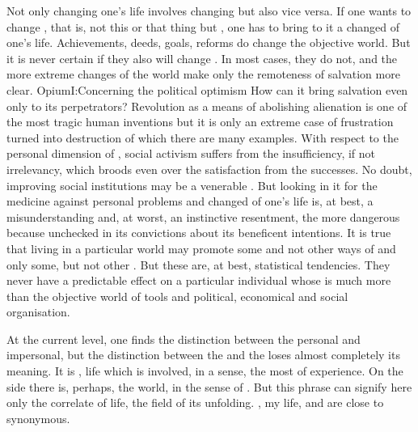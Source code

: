 \pa Not only changing one's life involves changing  but also vice
versa.  If one wants to change , that is, not this or that thing
but , one has to bring to it a changed  of one's life.
Achievements, deeds, goals, reforms do change the {objective world}. But it is
never certain if they also will change . In most cases, they do
not, and the more extreme changes of the world make only the remoteness of
salvation more clear. \citet{How can an event which, like war, eliminates
  discussion and opens every possibility by denying every norm, bring salvation
  to humanity?}{Opium}{I:Concerning the political optimism} How can
it bring salvation even only to its perpetrators?  Revolution as a means of
abolishing alienation is one of the most tragic human inventions but it is only
an extreme case of frustration turned into destruction of which there are many
examples. With respect to the personal dimension of , social
activism suffers from the insufficiency, if not irrelevancy, 
which broods even over the satisfaction from the  
successes.  No doubt, improving social institutions may be a venerable
. But looking in it for the medicine against personal problems and
changed  of one's life is, at best, a misunderstanding and, at
worst, an instinctive resentment, the more dangerous because unchecked in its
convictions about its beneficent intentions. It is true that living in a particular
world may promote some and not other ways of  and only some,
but not other .  But these are, at best, statistical
tendencies. They never have a predictable effect on a particular individual
whose  is much more than the {objective world} of tools and political,
economical and social organisation.



\pa At the current level, one finds the distinction between the personal and
impersonal, but the distinction between the  and the
 loses almost completely its meaning.  It is ,
 life which is involved, in a sense, the most 
 of experience. On the  side there is, perhaps, the
world, in the sense of . But this phrase can signify here
only the correlate of  life, the field of its unfolding.  ,
{my life},  and  are close to synonymous.
 
